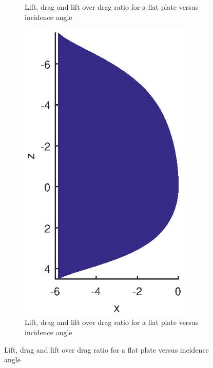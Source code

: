 \begin{figure}[h]
	\centering
	\begin{subfigure}[b]{0.3\textwidth}
			\centering
		\setlength{} 
		\setlength{}
		
		\caption{Lift, drag and lift over drag ratio for a flat plate versus incidence angle}
	\end{subfigure}

	\begin{subfigure}[b]{0.3\textwidth} \label{fig:skewnessplot}
		\centering
		\includegraphics[width=0.9\textwidth]{./Figure/Aerodynamics/skewness.eps}
		\caption{Lift, drag and lift over drag ratio for a flat plate versus incidence angle}
	\end{subfigure}
\end{figure}
